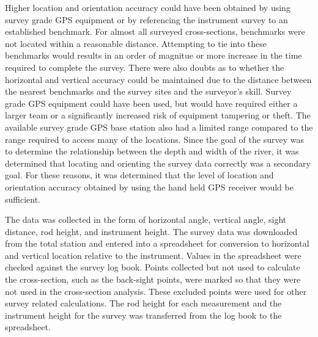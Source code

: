 Higher location and orientation accuracy could have been obtained by using survey grade GPS equipment or by referencing the instrument survey to an established benchmark.  For almost all surveyed cross-sections, benchmarks were not located within a reasonable distance.  Attempting to tie into these benchmarks would results in an order of magnitue or more increase in the time required to complete the survey.  There were also doubts as to whether the horizontal and vertical accuracy could be maintained due to the distance between the nearest benchmarks and the survey sites and the surveyor's skill.  Survey grade GPS equipment could have been used, but would have required either a larger team or a significantly increased risk of equipment tampering or theft.  The available survey grade GPS base station also had a limited range compared to the range required to access many of the locations.  Since the goal of the survey was to determine the relationship between the depth and width of the river, it was determined that locating and orienting the survey data correctly was a secondary goal. For these reasons, it was determined that the level of location and orientation accuracy obtained by using the hand held GPS receiver would be sufficient.

The data was collected in the form of horizontal angle, vertical angle, sight distance, rod height, and instrument height.  The survey data was downloaded from the total station and entered into a spreadsheet for conversion to horizontal and vertical location relative to the instrument.  Values in the spreadsheet were checked against the survey log book.  Points collected but not used to calculate the cross-section, such as the back-sight points, were marked so that they were not used in the cross-section analysis.  These excluded points were used for other survey related calculations.  The rod height for each measurement and the instrument height for the survey was transferred from the log book to the spreadsheet.  

